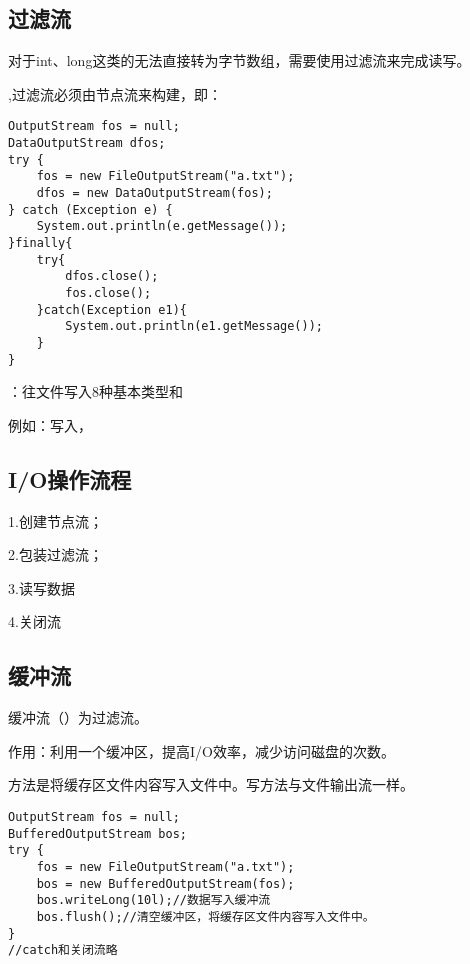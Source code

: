\documentclass[a4paper]{report}
\begin{document}
\subsection{过滤流}
对于int、long这类的无法直接转为字节数组，需要使用过滤流来完成读写。

,过滤流必须由节点流来构建，即：
\begin{lstlisting}
OutputStream fos = null;
DataOutputStream dfos;
try {
    fos = new FileOutputStream("a.txt");
    dfos = new DataOutputStream(fos);
} catch (Exception e) {
    System.out.println(e.getMessage());
}finally{
    try{
        dfos.close();
        fos.close();
    }catch(Exception e1){
        System.out.println(e1.getMessage());
    }
}
\end{lstlisting}
\begin{tips}
：往文件写入8种基本类型和

例如：写入，
\end{tips}
\subsection{I/O操作流程}
1.创建节点流；

2.包装过滤流；

3.读写数据

4.关闭流
\subsection{缓冲流}
缓冲流（）为过滤流。

作用：利用一个缓冲区，提高I/O效率，减少访问磁盘的次数。

方法是将缓存区文件内容写入文件中。写方法与文件输出流一样。
\begin{lstlisting}
OutputStream fos = null;
BufferedOutputStream bos;
try {
    fos = new FileOutputStream("a.txt");
    bos = new BufferedOutputStream(fos);
    bos.writeLong(10l);//数据写入缓冲流
    bos.flush();//清空缓冲区，将缓存区文件内容写入文件中。
}
//catch和关闭流略
\end{lstlisting}
\end{document}
